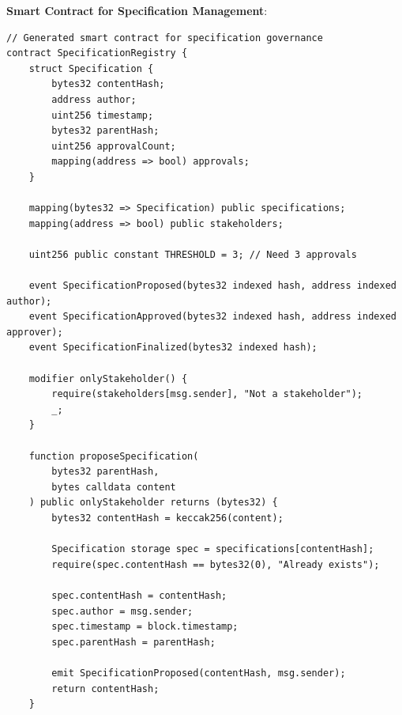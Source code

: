 \begin{definition}[Specification Transaction]}
    A specification transaction $T = (O_{prev}, O_{new}, sig, ts)$ where:
    \begin{itemize}
        \item $O_{prev}$ is previous specification hash
        \item $O_{new}$ is new specification content
        \item $sig$ is author signature
        \item $ts$ is timestamp
    \end{itemize}
\end{definition}

\textbf{Smart Contract for Specification Management}:

\begin{verbatim}
// Generated smart contract for specification governance
contract SpecificationRegistry {
    struct Specification {
        bytes32 contentHash;
        address author;
        uint256 timestamp;
        bytes32 parentHash;
        uint256 approvalCount;
        mapping(address => bool) approvals;
    }

    mapping(bytes32 => Specification) public specifications;
    mapping(address => bool) public stakeholders;

    uint256 public constant THRESHOLD = 3; // Need 3 approvals

    event SpecificationProposed(bytes32 indexed hash, address indexed author);
    event SpecificationApproved(bytes32 indexed hash, address indexed approver);
    event SpecificationFinalized(bytes32 indexed hash);

    modifier onlyStakeholder() {
        require(stakeholders[msg.sender], "Not a stakeholder");
        _;
    }

    function proposeSpecification(
        bytes32 parentHash,
        bytes calldata content
    ) public onlyStakeholder returns (bytes32) {
        bytes32 contentHash = keccak256(content);

        Specification storage spec = specifications[contentHash];
        require(spec.contentHash == bytes32(0), "Already exists");

        spec.contentHash = contentHash;
        spec.author = msg.sender;
        spec.timestamp = block.timestamp;
        spec.parentHash = parentHash;

        emit SpecificationProposed(contentHash, msg.sender);
        return contentHash;
    }


\end{verbatim}
